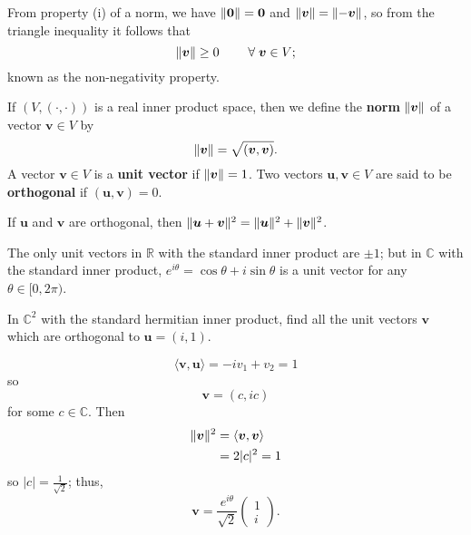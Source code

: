 \begin{remark}
    From property (i) of a norm, we have $\lVert\bm{0}\rVert = \bm{0}$ and $\lVert\bm{v}\rVert = \lVert- \bm{v}\rVert$, so from the triangle inequality it follows that \[ \lVert\bm{v}\rVert \geq 0 \qquad \; \forall \; \bm v \in V; \] known as the non-negativity property.
\end{remark}

\begin{definition}
    If $(V, (\cdot, \cdot))$ is a real inner product space, then we define the \textbf{norm} $\lVert\bm{v}\rVert$ of a vector $\bm{v} \in V$ by \[ \lVert\bm{v}\rVert = \sqrt{(\bm{v}, \bm{v})}. \] A vector $\bm{v} \in V$ is a \textbf{unit vector} if $\lVert\bm{v}\rVert = 1$. Two vectors $\bm{u}, \bm{v} \in V$ are said to be \textbf{orthogonal} if $(\bm{u}, \bm{v}) = 0$.
\end{definition}

\begin{theorem}[Pythagoras]
     If $\bm{u}$ and $\bm{v}$ are orthogonal, then $\lVert\bm{u} + \bm{v}\rVert^2 = \lVert\bm{u}\rVert^2 + \lVert\bm{v}\rVert^2$.
\end{theorem}

\begin{example}
    The only unit vectors in $\mathbb{R}$ with the standard inner product are $\pm 1$; but in $\mathbb{C}$ with the standard inner product, $e^{i \theta} = \cos{\theta} + i \sin{\theta}$ is a unit vector for any $\theta \in [0, 2\pi)$.
\end{example}

\begin{example}
    In $\mathbb{C}^2$ with the standard hermitian inner product, find all the unit vectors $\bm{v}$ which are orthogonal to $\bm{u} = (i, 1)$.

    \[ \langle \bm{v}, \bm{u} \rangle = -i v_1 + v_2 = 1 \] so \[ \bm{v} = (c, ic) \] for some $c \in \mathbb{C}$. Then
    \begin{align*}
        \lVert\bm{v}\rVert^2 &= \langle \bm{v}, \bm{v} \rangle \\
        &= 2|c|^2 = 1
    \end{align*}
    so $|c| = \frac{1}{\sqrt{2}}$; thus, 
    \[ 
        \bm{v} = \frac{e^{i \theta}}{\sqrt{2}} 
        \begin{pmatrix}
            1 \\ i
        \end{pmatrix}.
    \]
\end{example}

